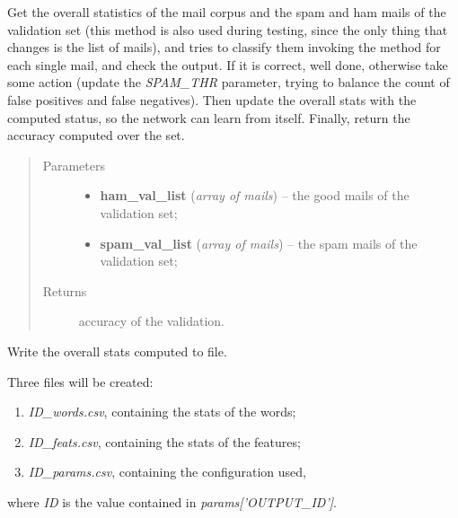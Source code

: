 \documentclass[letterpaper,10pt,english]{sphinxmanual}
\begin{document}
\begin{fulllineitems}
\begin{fulllineitems}
Get the overall statistics of the mail corpus and the spam and ham
mails of the validation set (this method is also used during testing,
since the only thing that changes is the list of mails), and tries to
classify them invoking the {\hyperref[index:classifier.Classifier.classify]{}} method
for each single mail, and check the output. If it is correct, well done,
otherwise take some action (update the \emph{SPAM\_THR} parameter, trying to
balance the count of false positives and false negatives). Then update
the overall stats with the computed status, so the network can learn
from itself. Finally, return the accuracy computed over the set.
\begin{quote}\begin{description}
\item[{Parameters}] \leavevmode\begin{itemize}
\item {} 
\textbf{ham\_val\_list} (\emph{array of mails}) -- the good mails of the validation set;

\item {} 
\textbf{spam\_val\_list} (\emph{array of mails}) -- the spam mails of the validation set;

\end{itemize}

\item[{Returns}] \leavevmode
accuracy of the validation.

\end{description}\end{quote}

\end{fulllineitems}


\begin{fulllineitems}
\label{index:naive_bayes.Bayes.write_bayes}
Write the overall stats computed to file.

Three files will be created:
\begin{enumerate}
\item {} 
\emph{ID\_words.csv}, containing the stats of the words;

\item {} 
\emph{ID\_feats.csv}, containing the stats of the features;

\item {} 
\emph{ID\_params.csv}, containing the configuration used,

\end{enumerate}

where \emph{ID} is the value contained in \emph{params{[}'OUTPUT\_ID'{]}}.

\end{fulllineitems}


\end{fulllineitems}
\end{document}
